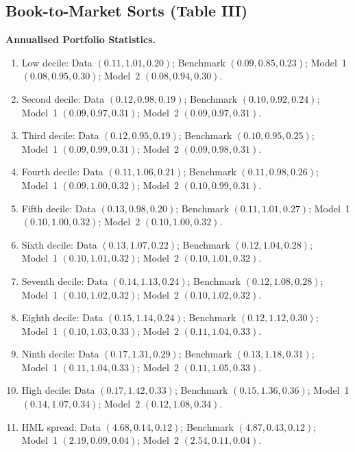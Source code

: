 \documentclass[11pt,a4paper]{article}
\numberwithin{equation}{section}
\begin{document}
\subsection{Book-to-Market Sorts (Table III)}
\noindent\textbf{Annualised Portfolio Statistics.}
\begin{enumerate}[label=\arabic*., leftmargin=1.6em]
  \item Low decile: Data $(0.11, 1.01, 0.20)$; Benchmark $(0.09, 0.85, 0.23)$; Model~1 $(0.08, 0.95, 0.30)$; Model~2 $(0.08, 0.94, 0.30)$.
  \item Second decile: Data $(0.12, 0.98, 0.19)$; Benchmark $(0.10, 0.92, 0.24)$; Model~1 $(0.09, 0.97, 0.31)$; Model~2 $(0.09, 0.97, 0.31)$.
  \item Third decile: Data $(0.12, 0.95, 0.19)$; Benchmark $(0.10, 0.95, 0.25)$; Model~1 $(0.09, 0.99, 0.31)$; Model~2 $(0.09, 0.98, 0.31)$.
  \item Fourth decile: Data $(0.11, 1.06, 0.21)$; Benchmark $(0.11, 0.98, 0.26)$; Model~1 $(0.09, 1.00, 0.32)$; Model~2 $(0.10, 0.99, 0.31)$.
  \item Fifth decile: Data $(0.13, 0.98, 0.20)$; Benchmark $(0.11, 1.01, 0.27)$; Model~1 $(0.10, 1.00, 0.32)$; Model~2 $(0.10, 1.00, 0.32)$.
  \item Sixth decile: Data $(0.13, 1.07, 0.22)$; Benchmark $(0.12, 1.04, 0.28)$; Model~1 $(0.10, 1.01, 0.32)$; Model~2 $(0.10, 1.01, 0.32)$.
  \item Seventh decile: Data $(0.14, 1.13, 0.24)$; Benchmark $(0.12, 1.08, 0.28)$; Model~1 $(0.10, 1.02, 0.32)$; Model~2 $(0.10, 1.02, 0.32)$.
  \item Eighth decile: Data $(0.15, 1.14, 0.24)$; Benchmark $(0.12, 1.12, 0.30)$; Model~1 $(0.10, 1.03, 0.33)$; Model~2 $(0.11, 1.04, 0.33)$.
  \item Ninth decile: Data $(0.17, 1.31, 0.29)$; Benchmark $(0.13, 1.18, 0.31)$; Model~1 $(0.11, 1.04, 0.33)$; Model~2 $(0.11, 1.05, 0.33)$.
  \item High decile: Data $(0.17, 1.42, 0.33)$; Benchmark $(0.15, 1.36, 0.36)$; Model~1 $(0.14, 1.07, 0.34)$; Model~2 $(0.12, 1.08, 0.34)$.
  \item HML spread: Data $(4.68, 0.14, 0.12)$; Benchmark $(4.87, 0.43, 0.12)$; Model~1 $(2.19, 0.09, 0.04)$; Model~2 $(2.54, 0.11, 0.04)$.
\end{enumerate}
\end{document}
